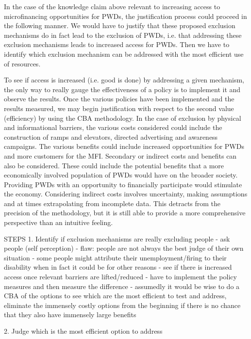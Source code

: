 \documentclass[a4paper]{article}
\begin{document}
In the case of the knowledge claim above relevant to increasing access to
microfinancing opportunities for PWDs, the justification process could proceed
in the following manner. We would have to justify that these proposed
exclusion mechanisms do in fact lead to the exclusion of PWDs, i.e.  that
addressing these exclusion mechanisms leads to increased access for PWDs.
Then we have to identify which exclusion mechanism can be addressed
with the most efficient use of resources. 

To see if access is increased (i.e. good is done) by addressing a given
mechanism, the only way to really gauge the effectiveness of a policy is to
implement it and observe the results. Once the various policies have been
implemented and the results measured, we may begin justification with respect
to the second value (efficiency) by using the CBA methodology. In the case of
exclusion by physical and informational barriers, the various costs considered
could include the construction of ramps and elevators, directed advertising
and awareness campaigns. The various benefits could include increased
opportunities for PWDs and more customers for the MFI. Secondary or indirect
costs and benefits can also be considered. These could include the potential
benefits that a more economically involved population of PWDs would have on
the broader society. Providing PWDs with an opportunity to financially
participate would stimulate the economy. Considering indirect costs involves
uncertainty, making assumptions and at times extrapolating from incomplete
data. This detracts from the precision of the methodology, but it is still
able to provide a more comprehensive perspective than an intuitive feeling.


STEPS
1. Identify if exclusion mechanisms are really excluding people
    - ask people (self perception)
        - flaw: people are not always the best judge of their own situation
            - some people might attribute their unemployment/firing to their
            disability when in fact it could be for other reasons
    - see if there is increased access once relevant barriers are
      lifted/reduced
        - have to implement the policy measures and then measure the
          difference
        - assumedly it would be wise to do a CBA of the options to see which
        are the most efficient to test and address, eliminate the immensely
        costly options from the beginning if there is no chance that they also
        have immensely large benefits

2. Judge which is the most efficient option to address
\end{document}
